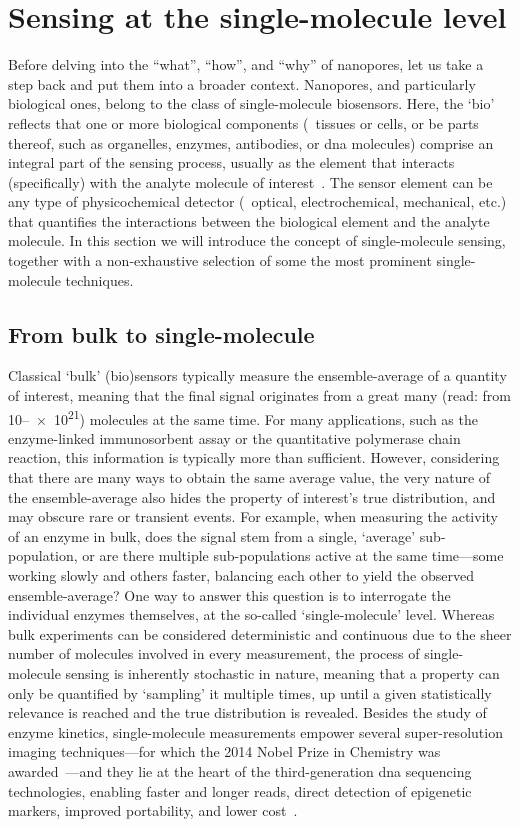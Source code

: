 %
%
\section{Sensing at the single-molecule level}
%

Before delving into the ``what'', ``how'', and ``why'' of nanopores, let us take a step back and put them into
a broader context. Nanopores, and particularly biological ones, belong to the class of single-molecule
biosensors. Here, the `bio' reflects that one or more biological components (\eg~tissues or cells, or be parts
thereof, such as organelles, enzymes, antibodies, or \gls{dna} molecules) comprise an integral part of the
sensing process, usually as the element that interacts (specifically) with the analyte molecule of
interest~\cite{Banica-2012}. The sensor element can be any type of physicochemical detector (\eg~optical,
electrochemical, mechanical, etc.) that quantifies the interactions between the biological element and the
analyte molecule. In this section we will introduce the concept of single-molecule sensing, together with a
non-exhaustive selection of some the most prominent single-molecule techniques.

\subsection{From bulk to single-molecule}

Classical `bulk' (bio)sensors typically measure the ensemble-average of a quantity of interest, meaning that
the final signal originates from a great many (read: from \numrange{10}{e21}) molecules at the same time. For
many applications, such as the enzyme-linked immunosorbent assay or the quantitative polymerase chain
reaction, this information is typically more than sufficient. However, considering that there are many ways to
obtain the same average value, the very nature of the ensemble-average also hides the property of interest's
true distribution, and may obscure rare or transient events. For example, when measuring the activity of an
enzyme in bulk, does the signal stem from a single, `average' sub-population, or are there multiple
sub-populations active at the same time---some working slowly and others faster, balancing each other to yield
the observed ensemble-average? One way to answer this question is to interrogate the individual enzymes
themselves, at the so-called `single-molecule' level. Whereas bulk experiments can be considered deterministic
and continuous due to the sheer number of molecules involved in every measurement, the process of
single-molecule sensing is inherently stochastic in nature, meaning that a property can only be quantified by
`sampling' it multiple times, up until a given statistically relevance is reached and the true distribution is
revealed. Besides the study of enzyme kinetics, single-molecule measurements empower several super-resolution
imaging techniques---for which the 2014 Nobel Prize in Chemistry was awarded~\cite{Weiss-2014}---and they lie
at the heart of the third-generation \gls{dna} sequencing technologies, enabling faster and longer reads,
direct detection of epigenetic markers, improved portability, and lower cost~\cite{Schadt-2010}.

